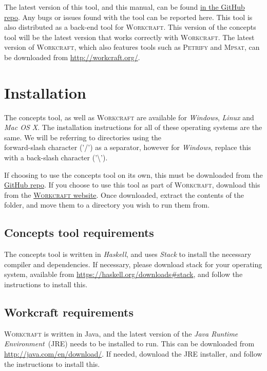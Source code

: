 \documentclass{proc}
\newcommand{\noun}[1]{\textsc{#1}}
\begin{document}
The latest version of this tool, and this manual, can be found \href{https://github.com/tuura/concepts}{in the GitHub repo}. Any bugs or issues found with the tool can be reported here. 
This tool is also distributed as a back-end tool for \noun{Workcraft}. This version of the concepts tool will be the latest version that works correctly with \noun{Workcraft}. The latest 
version of \noun{Workcraft}, which also features tools  such as \noun{Petrify} and \noun{Mpsat}, can be downloaded from \url{http://workcraft.org/}. 

\section{Installation}

The concepts tool, as well as \noun{Workcraft} are available for \emph{Windows}, \emph{Linux} and \emph{Mac OS X}. The installation instructions for all of these operating systems are 
the same. We will be referring to directories using the \\forward-slash character ('/') as a separator, however for \emph{Windows}, replace this with a back-slash character 
('\textbackslash').

If choosing to use the concepts tool on its own, this must be 
downloaded from the \href{https://github.com/tuura/concepts}{GitHub repo}. If you choose to use this tool as part of \noun{Workcraft}, download this from the 
\href{http://workcraft.org/}{\noun{Workcraft} website}. Once downloaded, extract the contents of the folder, and move them to a directory you wish to run them from. 

\subsection{Concepts tool requirements\label{sub:Concepts_requirements}}

The concepts tool is written in \emph{Haskell}, and uses \emph{Stack} to install the necessary compiler and dependencies. If necessary, please download stack for your operating 
system, available from \url{https://haskell.org/downloads#stack}, and follow the instructions to install this.

\subsection{Workcraft requirements}

\noun{Workcraft} is written in Java, and the latest version of the \emph{Java Runtime Environment}~(JRE) needs to be installed to run.  This can be downloaded from 
\url{http://java.com/en/download/}. If needed, download the JRE installer, and follow the instructions to install this.
\end{document}

